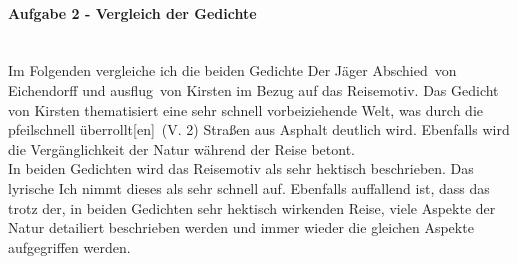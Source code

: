 \documentclass[12pt,a4paper]{report}
\begin{document}
	\paragraph{Aufgabe 2 - Vergleich der Gedichte} \mbox{} \\
	Im Folgenden vergleiche ich die beiden Gedichte \dq Der Jäger Abschied\dq\ von Eichendorff und \dq ausflug\dq\ von Kirsten im Bezug auf das \dq Reisemotiv\dq.
	Das Gedicht von Kirsten thematisiert eine sehr schnell vorbeiziehende Welt, was durch die \dq pfeilschnell überrollt[en]\dq\ (V. 2) Straßen aus Asphalt deutlich wird.
	Ebenfalls wird die Vergänglichkeit der Natur während der Reise betont. \\
	In beiden Gedichten wird das Reisemotiv als sehr hektisch beschrieben.
	Das lyrische Ich nimmt dieses als sehr schnell auf.
	Ebenfalls auffallend ist, dass das trotz der, in beiden Gedichten sehr hektisch wirkenden Reise, viele Aspekte der Natur detailiert beschrieben werden und immer wieder die gleichen Aspekte aufgegriffen werden.	
\end{document}
